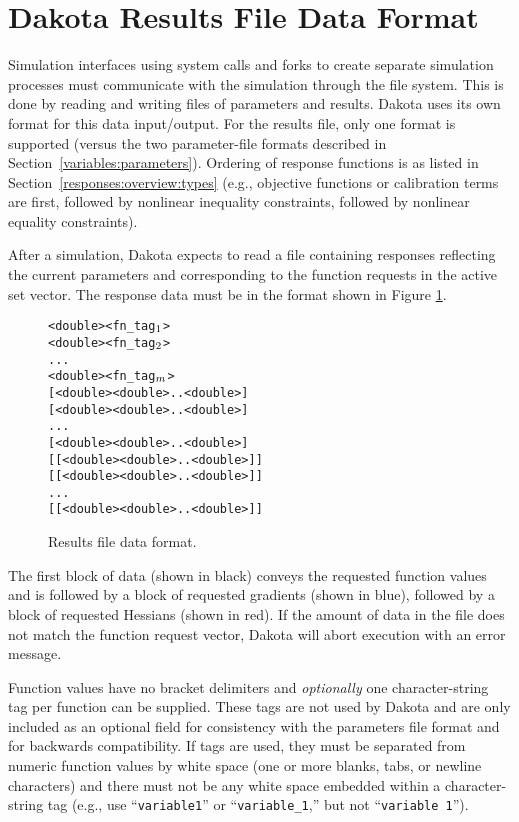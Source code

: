 \section{Dakota Results File Data Format}\label{responses:results}

Simulation interfaces using system calls and forks to create
separate simulation processes must communicate with the simulation
through the file system. This is done by reading and
writing files of parameters and results. Dakota uses its own format
for this data input/output. For the results file, only one format is
supported (versus the two parameter-file formats described in
Section~\ref{variables:parameters}). Ordering of response functions is
as listed in Section~\ref{responses:overview:types} (e.g., objective
functions or calibration terms are first, followed by nonlinear
inequality constraints, followed by nonlinear equality constraints).

After a simulation, Dakota expects to read a file
containing responses reflecting the current parameters and
corresponding to the function requests in the active
set vector. The response data must be in the format
shown in Figure \ref{responses:figure01}.

\begin{figure}
  \centering
  \begin{bigbox}
  \begin{alltt}
    <double> <fn_tag\(\sb{1}\)>
    <double> <fn_tag\(\sb{2}\)>
    ...
    <double> <fn_tag\(\sb{m}\)> \color{blue}
    [ <double> <double> .. <double> ]
    [ <double> <double> .. <double> ]
    ...
    [ <double> <double> .. <double> ] \color{red}
    [[ <double> <double> .. <double> ]]
    [[ <double> <double> .. <double> ]]
    ...
    [[ <double> <double> .. <double> ]]
  \end{alltt}
  \end{bigbox}
  \caption{Results file data format.}
  \label{responses:figure01}
\end{figure}

The first block of data (shown in black) conveys the requested function values
and is followed by a block of requested gradients
(shown in blue), followed by a block of requested Hessians (shown
in red). If the amount of data in the file does not match the function
request vector, Dakota will abort execution with an error message.

Function values have no bracket delimiters and \emph{optionally} one
character-string tag per function can be supplied.  These tags are not
used by
Dakota and are only included as an optional field for consistency with
the parameters file format and for backwards compatibility.  If
tags are used, they must be separated from
numeric function values by white space (one or more blanks, tabs, or newline
characters) and there must not
be any white space embedded within a character-string tag (e.g., use
``\texttt{variable1}'' or ``\texttt{variable\_1},'' but not
``\texttt{variable 1}'').

